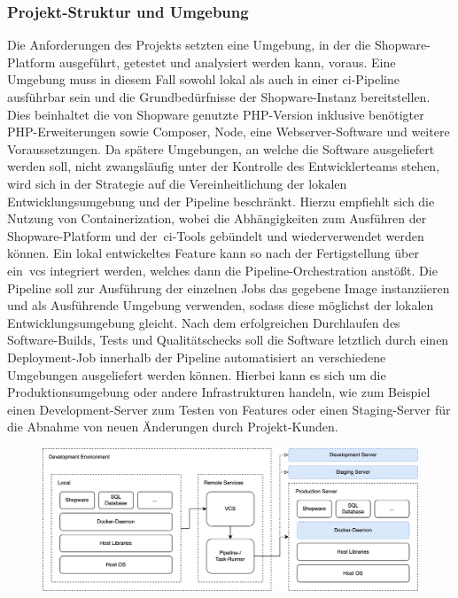 \subsubsection{Projekt-Struktur und Umgebung}

Die Anforderungen des Projekts setzten eine Umgebung, in der die Shopware-Platform ausgeführt, getestet und analysiert
werden kann, voraus.
Eine Umgebung muss in diesem Fall sowohl lokal als auch in einer \acrshort{ci}-Pipeline ausführbar sein und die
Grundbedürfnisse der Shopware-Instanz bereitstellen.
Dies beinhaltet die von Shopware genutzte PHP-Version inklusive benötigter PHP-Erweiterungen sowie Composer, Node, eine
Webserver-Software und weitere Voraussetzungen.
Da spätere Umgebungen, an welche die Software ausgeliefert werden soll, nicht zwangsläufig unter der
Kontrolle des Entwicklerteams stehen, wird sich in der Strategie auf die Vereinheitlichung der lokalen
Entwicklungsumgebung und der Pipeline beschränkt.
Hierzu empfiehlt sich die Nutzung von Containerization, wobei die Abhängigkeiten zum Ausführen der Shopware-Platform
und der\ \acrshort{ci}-Tools gebündelt und wiederverwendet werden können.
Ein lokal entwickeltes Feature kann so nach der Fertigstellung über ein\ \acrshort{vcs} integriert werden, welches dann
die Pipeline-Orchestration anstößt.
Die Pipeline soll zur Ausführung der einzelnen Jobs das gegebene Image instanziieren und als Ausführende
Umgebung verwenden, sodass diese möglichst der lokalen Entwicklungsumgebung gleicht.
Nach dem erfolgreichen Durchlaufen des Software-Builds, Tests und Qualitätschecks soll die Software letztlich durch
einen Deployment-Job innerhalb der Pipeline automatisiert an verschiedene Umgebungen ausgeliefert werden können.
Hierbei kann es sich um die Produktionsumgebung oder andere Infrastrukturen handeln, wie zum Beispiel einen
Development-Server zum Testen von Features oder einen Staging-Server für die Abnahme von neuen Änderungen durch
Projekt-Kunden.

\begin{figure}[H]
    \centering
    \includegraphics[width=\textwidth]{images/content/ci-architecture-concept}
    \label{fig:ci-architecture-concept}
\end{figure}

